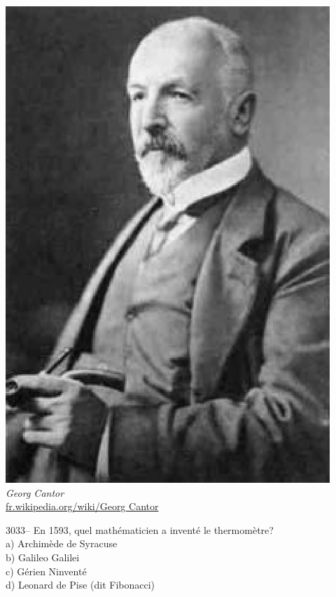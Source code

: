 \documentclass[letterpaper, 12pt]{article}
\begin{document}
\begin{center}
\includegraphics[scale=0.5]{Georg_Cantor.eps}\\
\emph{{\small Georg Cantor}}\\
\href{http://fr.wikipedia.org/wiki/Georg Cantor}{fr.wikipedia.org/wiki/Georg Cantor}\\[5mm]
\end{center}



3033-- En 1593, quel math\'ematicien a invent\'e le thermom\`etre?\\

a) Archim\`ede de Syracuse\\
b) Galileo Galilei\\
c) G\'erien Ninvent\'e\\
d) Leonard de Pise (dit Fibonacci)\\
\end{document}
